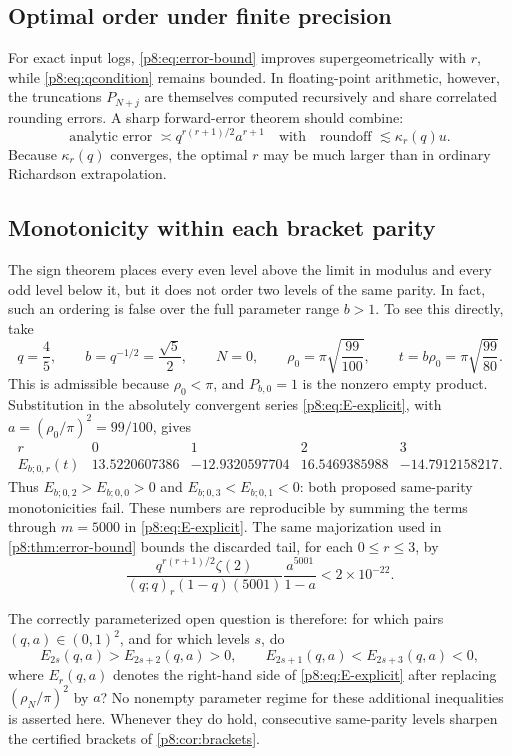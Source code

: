 \documentclass[11pt]{article}
\numberwithin{equation}{section}
\theoremstyle{definition}
\theoremstyle{remark}
\begin{document}
\subsection{Optimal order under finite precision}

For exact input logs, \cref{p8:eq:error-bound} improves supergeometrically with $r$, while \cref{p8:eq:qcondition} remains bounded. In floating-point arithmetic, however, the truncations $P_{N+j}$ are themselves computed recursively and share correlated rounding errors. A sharp forward-error theorem should combine:
\[
\text{analytic error }\asymp q^{r(r+1)/2}a^{r+1}
\quad\text{with}\quad
\text{roundoff }\lesssim\kappa_r(q)u.
\]
Because $\kappa_r(q)$ converges, the optimal $r$ may be much larger than in ordinary Richardson extrapolation.

\subsection{Monotonicity within each bracket parity}

The sign theorem places every even level above the limit in modulus and every odd level
below it, but it does not order two levels of the same parity.  In fact, such an ordering is
false over the full parameter range $b>1$.  To see this directly, take
\[
 q=\frac45,\qquad b=q^{-1/2}=\frac{\sqrt5}{2},\qquad N=0,
 \qquad \rho_0=\pi\sqrt{\frac{99}{100}},
 \qquad t=b\rho_0=\pi\sqrt{\frac{99}{80}}.
\]
This is admissible because $\rho_0<\pi$, and $P_{b,0}=1$ is the nonzero empty product.
Substitution in the absolutely convergent series \eqref{p8:eq:E-explicit}, with
$a=(\rho_0/\pi)^2=99/100$, gives
\[
\begin{array}{c|rrrr}
r&0&1&2&3\\ \hline
E_{b;0,r}(t)
& 13.5220607386&-12.9320597704&16.5469385988&-14.7912158217.
\end{array}
\]
Thus $E_{b;0,2}>E_{b;0,0}>0$ and
$E_{b;0,3}<E_{b;0,1}<0$: both proposed same-parity monotonicities fail.
These numbers are reproducible by summing the terms through $m=5000$ in
\eqref{p8:eq:E-explicit}.  The same majorization used in \cref{p8:thm:error-bound} bounds the
discarded tail, for each $0\le r\le3$, by
\[
 \frac{q^{r(r+1)/2}\zeta(2)}
 {(q;q)_r(1-q)(5001)}\frac{a^{5001}}{1-a}<2\times10^{-22}.
\]

The correctly parameterized open question is therefore: for which pairs
$(q,a)\in(0,1)^2$, and for which levels $s$, do
\[
 E_{2s}(q,a)>E_{2s+2}(q,a)>0,
 \qquad
 E_{2s+1}(q,a)<E_{2s+3}(q,a)<0,
\]
where $E_r(q,a)$ denotes the right-hand side of \eqref{p8:eq:E-explicit} after replacing
$(\rho_N/\pi)^2$ by $a$?  No nonempty parameter regime for these additional inequalities
is asserted here.  Whenever they do hold, consecutive same-parity levels sharpen the
certified brackets of \cref{p8:cor:brackets}.
\end{document}
